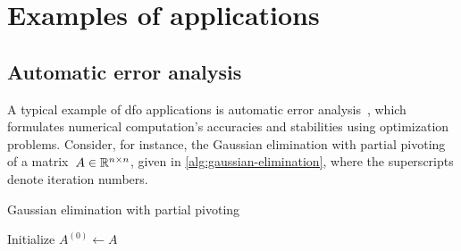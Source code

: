 \section{Examples of applications}

\subsection{Automatic error analysis}

A typical example of \gls{dfo} applications is automatic error analysis~\cite{Higham_1993,Higham_2002}, which formulates numerical computation's accuracies and stabilities using optimization problems.
Consider, for instance, the Gaussian elimination with partial pivoting of a matrix~$A \in \mathbb{R}^{n \times n}$, given in \cref{alg:gaussian-elimination}, where the superscripts denote iteration numbers.

\begin{algorithm}
    \caption{Gaussian elimination with partial pivoting}
    \label{alg:gaussian-elimination}
    \DontPrintSemicolon
    Initialize $A^{(0)} \gets A$\;
\end{algorithm}

